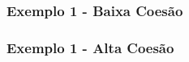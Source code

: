 \documentclass[aspectratio=169]{beamer}
\begin{document}
\begin{frame}[fragile]\frametitle{Exemplo 1 - Baixa Coesão}

\end{frame}

\begin{frame}[fragile]\frametitle{Exemplo 1 - Alta Coesão}
\begin{columns}
\begin{column}{0.5\linewidth}

\end{column}
\begin{column}{0.5\linewidth}

\end{column}
\end{columns}
\end{frame}
\end{document}
